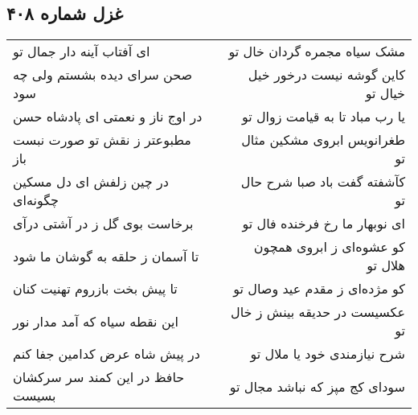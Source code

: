 \begin{center}
\section*{غزل شماره ۴۰۸}
\label{sec:sh408}
\begin{longtable}{l p{0.5cm} r}
ای آفتاب آینه دار جمال تو
&&
مشک سیاه مجمره گردان خال تو
\\
صحن سرای دیده بشستم ولی چه سود
&&
کاین گوشه نیست درخور خیل خیال تو
\\
در اوج ناز و نعمتی ای پادشاه حسن
&&
یا رب مباد تا به قیامت زوال تو
\\
مطبوعتر ز نقش تو صورت نبست باز
&&
طغرانویس ابروی مشکین مثال تو
\\
در چین زلفش ای دل مسکین چگونه‌ای
&&
کآشفته گفت باد صبا شرح حال تو
\\
برخاست بوی گل ز در آشتی درآی
&&
ای نوبهار ما رخ فرخنده فال تو
\\
تا آسمان ز حلقه به گوشان ما شود
&&
کو عشوه‌ای ز ابروی همچون هلال تو
\\
تا پیش بخت بازروم تهنیت کنان
&&
کو مژده‌ای ز مقدم عید وصال تو
\\
این نقطه سیاه که آمد مدار نور
&&
عکسیست در حدیقه بینش ز خال تو
\\
در پیش شاه عرض کدامین جفا کنم
&&
شرح نیازمندی خود یا ملال تو
\\
حافظ در این کمند سر سرکشان بسیست
&&
سودای کج مپز که نباشد مجال تو
\\
\end{longtable}
\end{center}
